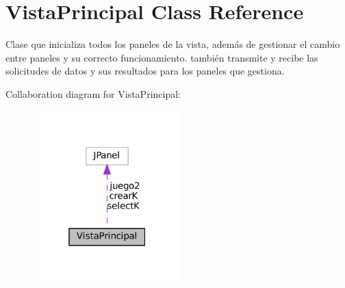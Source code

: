 \section{Vista\+Principal Class Reference}
\label{class_presentacion_1_1_vista_principal}


Clase que inicializa todos los paneles de la vista, además de gestionar el cambio entre paneles y su correcto funcionamiento. también transmite y recibe las solicitudes de datos y sus resultados para los paneles que gestiona.  




Collaboration diagram for Vista\+Principal\+:
\nopagebreak
\begin{figure}[H]
\begin{center}
\leavevmode
\includegraphics[width=163pt]{class_presentacion_1_1_vista_principal__coll__graph}
\end{center}
\end{figure}
